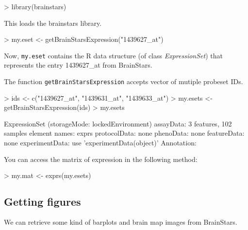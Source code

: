 \documentclass[12pt,fullpage]{article}
\newcommand{\Rfunction}[1]{{\texttt{#1}}}
\newcommand{\Robject}[1]{{\texttt{#1}}}
\newcommand{\Rclass}[1]{{\textit{#1}}}
\begin{document}
\begin{Schunk}
\begin{Sinput}
> library(brainstars)
\end{Sinput}
\end{Schunk}

This loads the brainstars library.

\begin{Schunk}
\begin{Sinput}
> my.eset <- getBrainStarsExpression("1439627_at")
\end{Sinput}
\end{Schunk}

Now, \Robject{my.eset} contains the R data structure (of class \Rclass{ExpressionSet}) that represents the entry 1439627\_at from BrainStars.

The function \Rfunction{getBrainStarsExpression} accepts vector of mutiple probeset IDs.
\begin{Schunk}
\begin{Sinput}
> ids <- c("1439627_at", "1439631_at", "1439633_at")
> my.esets <- getBrainStarsExpression(ids)
> my.esets
\end{Sinput}
\begin{Soutput}
ExpressionSet (storageMode: lockedEnvironment)
assayData: 3 features, 102 samples 
  element names: exprs 
protocolData: none
phenoData: none
featureData: none
experimentData: use 'experimentData(object)'
Annotation:  
\end{Soutput}
\end{Schunk}

You can access the matrix of expression in the following method:
\begin{Schunk}
\begin{Sinput}
> my.mat <- exprs(my.esets)
\end{Sinput}
\end{Schunk}

\subsection{Getting figures}
We can retrieve some kind of barplots and brain map images from BrainStars.
\end{document}
